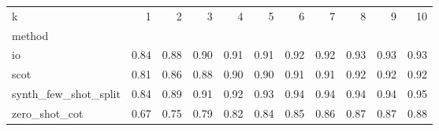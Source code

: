 \begin{tabular}{lrrrrrrrrrr}
\toprule
k & 1 & 2 & 3 & 4 & 5 & 6 & 7 & 8 & 9 & 10 \\
method &  &  &  &  &  &  &  &  &  &  \\
\midrule
io & 0.84 & 0.88 & 0.90 & 0.91 & 0.91 & 0.92 & 0.92 & 0.93 & 0.93 & 0.93 \\
scot & 0.81 & 0.86 & 0.88 & 0.90 & 0.90 & 0.91 & 0.91 & 0.92 & 0.92 & 0.92 \\
synth_few_shot_split & 0.84 & 0.89 & 0.91 & 0.92 & 0.93 & 0.94 & 0.94 & 0.94 & 0.94 & 0.95 \\
zero_shot_cot & 0.67 & 0.75 & 0.79 & 0.82 & 0.84 & 0.85 & 0.86 & 0.87 & 0.87 & 0.88 \\
\bottomrule
\end{tabular}

